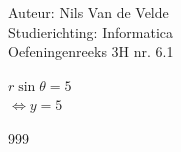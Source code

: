 \documentclass[a4paper]{article}
\begin{document}
  
\noindent \large Auteur: Nils Van de Velde \\
\noindent \large Studierichting: Informatica\\
\noindent \large Oefeningenreeks 3H nr. 6.1\\

\medskip

\normalsize

$r\sin\theta = 5$\\

$\Leftrightarrow y = 5$\\

\begin{thebibliography}{999}
\end{thebibliography}
\end{document}
